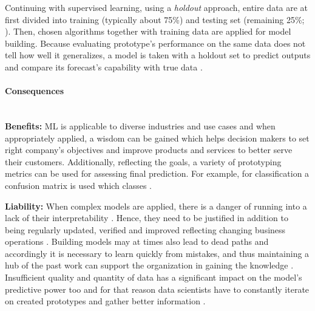 Continuing with supervised learning, using a \emph{holdout} approach, entire data are at first divided into training (typically about 75\%) and testing set (remaining 25\%; \cite{Kohavi:1995:SCB:1643031.1643047}).
Then, chosen algorithms together with training data are applied for model building. 
Because evaluating prototype's performance on the same data does not tell how well it generalizes, a model is taken with a holdout set to predict outputs and compare its forecast's capability with true data \parencites{FosterProvost2013DataThinking}{JakeVanderPlas2016PythonHandbook}.

\paragraph*{Consequences} ~\\
{\hspace*{14.5pt} \textbf{Benefits:} \hspace*{-5pt} }
\ac{ML} is applicable to diverse industries and use cases and when appropriately applied, a wisdom can be gained which helps decision makers to set right company's objectives and improve products and services to better serve their customers.
Additionally, reflecting the goals, a variety of prototyping metrics can be used for assessing final prediction. 
For example, for classification a confusion matrix is used which  classes \parencite[94]{NinaBookR2014}.

\textbf{Liability:}
When complex models are applied, there is a danger of running into a lack of their interpretability \parencite{NadaML2004}. 
Hence, they need to be justified in addition to being regularly updated, verified and improved reflecting changing business operations \parencite{SAS2016}.
Building models may at times also lead to dead paths and accordingly it is necessary to learn quickly from mistakes, and thus maintaining a hub of the past work can support the organization in gaining the knowledge \parencites{Domino2017DS}{SASBP2007}{GoogleDebt1}.
Insufficient quality and quantity of data has a significant impact on the model's predictive power too and for that reason data scientists have to constantly iterate on created prototypes and gather better information \parencites{Zinkevitch2016}{CarlShan2015TheScientists}.

